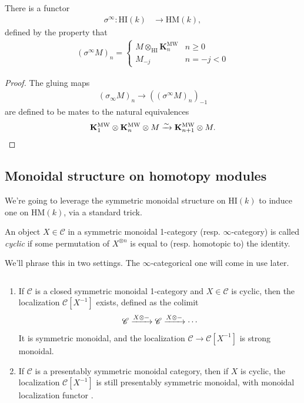 \documentclass[11pt,openany]{book}
\providecommand{\HI}{\mathrm{HI}}
\providecommand{\HM}{\mathrm{HM}}
\providecommand{\KMW}{\mathbf{K}^\mathrm{MW}}
\begin{document}
\begin{proposition} There is a functor
\begin{align*}
    \sigma^\infty \colon \HI(k) &\to \HM(k),
\end{align*}
defined by the property that 
\begin{align*}
    (\sigma^\infty M)_n = \begin{cases} 
    M \otimes_\HI \KMW_n & n\ge 0 \\
    M_{-j} & n=-j < 0 \end{cases}
\end{align*}
\end{proposition}
\begin{proof} The gluing maps
\begin{align*}
    (\sigma_\infty M)_n \to \left( (\sigma^\infty M)_n \right)_{-1}
\end{align*}
are defined to be mates to the natural equivalences
\begin{align*}
    \KMW_1 \otimes \KMW_n \otimes M \xto{\sim} \KMW_{n+1} \otimes M.
\end{align*}
\end{proof}



\subsection{Monoidal structure on homotopy modules}

We're going to leverage the symmetric monoidal structure on $\HI(k)$ to induce one on $\HM(k)$, via a standard trick.


\begin{definition} An object $X\in \mathscr{C}$ in a symmetric monoidal 1-category (resp. $\infty$-category) is called \textit{cyclic} if some permutation of $X^{\otimes n}$ is equal to (resp. homotopic to) the identity.
\end{definition}

We'll phrase this in two settings. The $\infty$-categorical one will come in use later.

\begin{theorem}\label{thm:cyclic-objects-localization}  $\ $
\begin{enumerate}
    \item If $\mathscr{C}$ is a closed symmetric monoidal 1-category and $X \in \mathscr{C}$ is cyclic, then the localization $\mathscr{C}[X^{-1}]$ exists, defined as the colimit
    \begin{align*}
        \mathscr{C} \xrightarrow{X \otimes -} \mathscr{C} \xrightarrow{X \otimes-} \cdots 
    \end{align*}
    It is symmetric monoidal, and the localization $\mathscr{C} \to \mathscr{C}[X^{-1}]$ is strong monoidal.
    \item If $\mathscr{C}$ is a presentably symmetric monoidal category, then if $X$ is cyclic, the localization $\mathscr{C}[X^{-1}]$ is still presentably symmetric monoidal, with monoidal localization functor \cite[\S2]{Robalo}.
\end{enumerate}

\end{theorem}
\end{document}
